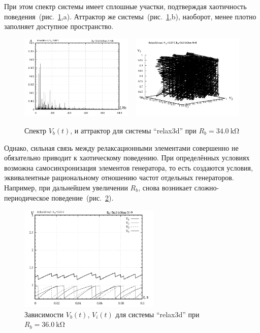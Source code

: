 При этом спектр системы имеет сплошные участки, подтверждая
хаотичность поведения~(рис.~\ref{atu:f:relax3d_f_08},a).
Аттрактор же системы~(рис.~\ref{atu:f:relax3d_f_08},b),
наоборот, менее плотно заполняет доступное пространство.

\begin{figure}[htb!]
  \centerline{
    \includegraphics[width=0.48\textwidth]{p/relax3d_f_08.png}
    ~
    \includegraphics[width=0.48\textwidth]{p/relax3d_v1v2v3_08.png}
  }
  \caption{Спектр $V_b(t)$, и аттрактор для системы ``relax3d'' при $R_b=\SI{34.0}{\kilo\ohm}$ }
  \label{atu:f:relax3d_f_08}
\end{figure}

Однако, сильная связь между релаксационными элементами
совершенно не обязательно приводит к хаотическому поведению.
При определённых условиях возможна самосинхронизация
элементов генератора, то есть создаются условия,
эквивалентные рациональному отношению частот отдельных генераторов.
Например, при дальнейшем увеличении $R_b$, снова
возникает сложно-периодическое поведение~(рис.~\ref{atu:f:relax3d_t_09}).

\begin{figure}[htb!]
  \centerline{\includegraphics[width=0.6\textwidth]{p/relax3d_t_09.png} }
  \caption{Зависимости $V_b(t)$, $V_i(t)$ для системы ``relax3d'' при $R_b=\SI{36.0}{\kilo\ohm}$ }
  \label{atu:f:relax3d_t_09}
\end{figure}

